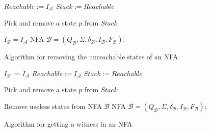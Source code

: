\begin{figure}[h!]
\begin{algorithm}[H]
	\label{algRemove}

  $Reachable := I_\mathcal{A}$\;
  $Stack := Reachable$\;
	
   {
			Pick and remove a state $p$ from $Stack$\;
	 }

  $I_{\mathcal{B}} = I_{\mathcal{A}}$\;
	\Return NFA $\mathcal{B}=(Q_\mathcal{B},\Sigma,\delta_\mathcal{B},I_\mathcal{B},F_\mathcal{B})$;
	\caption{Algorithm for removing the unreachable states of an NFA}
\end{algorithm}
\begin{algorithm}[H]
	\label{algCandidate}


  $I_\mathcal{B} := I_\mathcal{A}$\;
  $Reachable := I_\mathcal{A}$\;
  $Stack := Reachable$\;
	
   {
			Pick and remove a state $p$ from $Stack$\;
	}

  Remove useless states from NFA $\mathcal{B}$\;
	\Return NFA $\mathcal{B}=(Q_\mathcal{B},\Sigma,\delta_\mathcal{B},I_\mathcal{B},F_\mathcal{B})$;
	\caption{Algorithm for getting a witness in an NFA}
\end{algorithm}


\end{figure}

